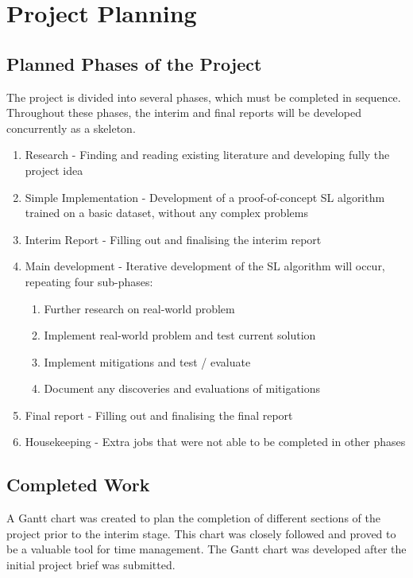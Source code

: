 \chapter{Project Planning}

\section{Planned Phases of the Project}
The project is divided into several phases, which must be completed in sequence. Throughout these phases, the interim and final reports will be developed concurrently as a skeleton.
\begin{enumerate}
	\item Research - Finding and reading existing literature and developing fully the project idea
	\item Simple Implementation - Development of a proof-of-concept SL algorithm trained on a basic dataset, without any complex problems
	\item Interim Report - Filling out and finalising the interim report
	\item Main development - Iterative development of the SL algorithm will occur, repeating four sub-phases:
	\begin{enumerate}
		\item Further research on real-world problem
		\item Implement real-world problem and test current solution
		\item Implement mitigations and test / evaluate
		\item Document any discoveries and evaluations of mitigations
	\end{enumerate}
	\item Final report - Filling out and finalising the final report
	\item Housekeeping - Extra jobs that were not able to be completed in other phases
\end{enumerate}



\section{Completed Work}
A Gantt chart was created to plan the completion of different sections of the project prior to the interim stage. This chart was closely followed and proved to be a valuable tool for time management. The Gantt chart was developed after the initial project brief was submitted.

